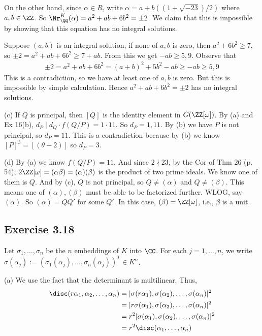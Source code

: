 \documentclass[../Chapter.tex]{subfiles}
\begin{document}
On the other hand, since $\alpha\in R$, write $\alpha=a+b((1+\sqrt{-23})/2)$ where $a,b\in\ZZ$. So $\Nr^K_\QQ(\alpha)=a^2+ab+6b^2=\pm 2$. We claim that this is impossible by showing that this equation has no integral solutions.

Suppose $(a,b)$ is an integral solution, if none of $a,b$ is zero, then $a^2+6b^2\geq 7$, so $\pm2 = a^2+ab+6b^2 \geq 7+ab$. From this we get $-ab\geq 5,9$. Observe that
\begin{align*}
\pm2 = a^2+ab+6b^2 = (a+b)^2+5b^2-ab \geq -ab \geq 5,9
\end{align*}
This is a contradiction, so we have at least one of $a,b$ is zero. But this is impossible by simple calculation. Hence $a^2+ab+6b^2=\pm2$ has no integral solutions.

(c) If $Q$ is principal, then $[Q]$ is the identity element in $G(\ZZ[\omega])$. By (a) and Ex 16(b), $d_P\mid d_Q\cdot f(Q/P)=1\cdot 11$. So $d_P=1,11$. By (b) we have $P$ is not principal, so $d_P=11$. This is a contradiction because by (b) we know $[P]^3=[(\theta-2)]$ so $d_P=3$.

(d) By (a) we know $f(Q/P)=11$. And since $2\nmid 23$, by the Cor of Thm 26 (p. 54), $2\ZZ[\omega]=(\alpha\beta)=(\alpha)(\beta)$ is the product of two prime ideals. We know one of them is $Q$. And by (c), $Q$ is not principal, so $Q\neq (\alpha)$ and $Q\neq(\beta)$. This means one of $(\alpha),(\beta)$ must be able to be factorized further. WLOG, say $(\alpha)$. So $(\alpha)=QQ'$ for some $Q'$. In this case, $(\beta)=\ZZ[\omega]$, i.e., $\beta$ is a unit.

\subsection*{Exercise 3.18}

Let $\sigma_1,\ldots,\sigma_n$ be the $n$ embeddings of $K$ into $\CC$. For each $j=1,\ldots,n$, we write $\sigma(\alpha_j):=(\sigma_1(\alpha_j),\ldots,\sigma_n(\alpha_j))^T\in K^n$.

(a) We use the fact that the determinant is multilinear. Thus,
\begin{align*}
\disc(r\alpha_1,\alpha_2,\ldots,\alpha_n) &= |\sigma(r\alpha_1),\sigma(\alpha_2),\ldots,\sigma(\alpha_n)|^2 \\
&= |r\sigma(\alpha_1),\sigma(\alpha_2),\ldots,\sigma(\alpha_n)|^2 \\
&= r^2|\sigma(\alpha_1),\sigma(\alpha_2),\ldots,\sigma(\alpha_n)|^2 \\
&= r^2\disc(\alpha_1,\ldots,\alpha_n)
\end{align*}
\end{document}
